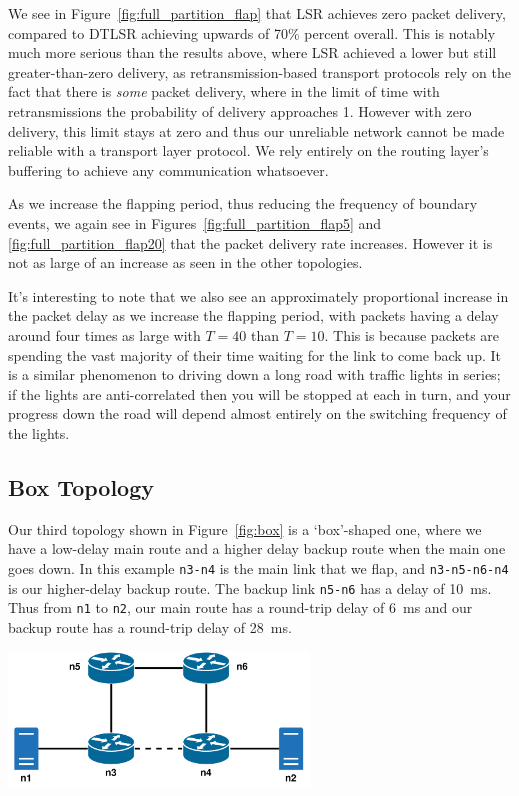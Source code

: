\documentclass[withindex,glossary,openany]{cam-thesis}
\begin{document}
We see in Figure~\ref{fig:full_partition_flap} that LSR achieves zero packet delivery, compared to DTLSR achieving upwards of 70\% percent overall. This is notably much more serious than the results above, where LSR achieved a lower but still greater-than-zero delivery, as retransmission-based transport protocols rely on the fact that there is \textit{some} packet delivery, where in the limit of time with retransmissions the probability of delivery approaches 1. However with zero delivery, this limit stays at zero and thus our unreliable network cannot be made reliable with a transport layer protocol. We rely entirely on the routing layer's buffering to achieve any communication whatsoever.

As we increase the flapping period, thus reducing the frequency of boundary events, we again see in Figures~\ref{fig:full_partition_flap5} and \ref{fig:full_partition_flap20} that the packet delivery rate increases. However it is not as large of an increase as seen in the other topologies.

It's interesting to note that we also see an approximately proportional increase in the packet delay as we increase the flapping period, with packets having a delay around four times as large with $T=40$ than $T=10$. This is because packets are spending the vast majority of their time waiting for the link to come back up. It is a similar phenomenon to driving down a long road with traffic lights in series; if the lights are anti-correlated then you will be stopped at each in turn, and your progress down the road will depend almost entirely on the switching frequency of the lights.


\subsection{Box Topology}

Our third topology shown in Figure~\ref{fig:box} is a `box'-shaped one, where we have a low-delay main route and a higher delay backup route when the main one goes down. In this example \texttt{n3-n4} is the main link that we flap, and \texttt{n3-n5-n6-n4} is our higher-delay backup route. The backup link \texttt{n5-n6} has a delay of \SI{10}{\ms}. Thus from \texttt{n1} to \texttt{n2}, our main route has a round-trip delay of \SI{6}{\ms} and our backup route has a round-trip delay of \SI{28}{\ms}.

\begin{minipage}{1\textwidth} \centering
	\includegraphics[width=0.6\textwidth]{delay_box_topology}
\end{minipage}
\end{document}
